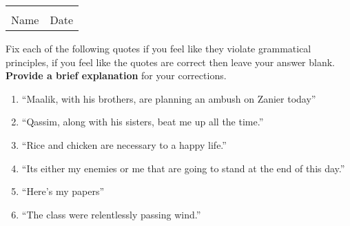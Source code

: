 \documentclass[12pt]{article} %
\begin{document}
  \vspace*{0.4cm}

	\begin{center}
	\noindent\begin{tabular}{ll}
		\makebox[3in]{\hrulefill} & \makebox[3in]{\hrulefill}\\
		Name & Date\\[8ex]%
	\end{tabular}
	\end{center}
	\newpage


\begin{qstn}[1]
  Fix each of the following quotes if you feel like they violate grammatical principles, if you feel like the quotes
  are correct then leave your answer blank. \textbf{Provide a brief explanation} for your corrections.

  \begin{enumerate}
    \item ``Maalik, with his brothers, are planning an ambush on Zanier today''
      \vspace*{4cm}

    \item ``Qassim, along with his sisters, beat me up all the time.''
      \vspace*{4cm}
      
    \item ``Rice and chicken are necessary to a happy life.''
      \vspace*{4cm}

    \item ``Its either my enemies or me that are going to stand at the end of this day.''
      \vspace*{4cm}

    \item ``Here's my papers''
    \vspace*{4cm}

    \item ``The class were relentlessly passing wind.''
    \vspace*{4cm}

  \end{enumerate}

  
\end{qstn}
\end{document}
